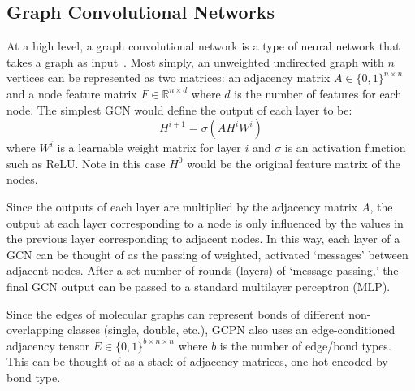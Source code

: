 \documentclass{article}
\begin{document}
\subsection{Graph Convolutional Networks}
At a high level, a graph convolutional network is a type of neural network that takes a graph as input~\cite{GCN}. Most simply, an unweighted undirected graph with $n$ vertices can be represented as two matrices: an adjacency matrix $A\in \{0,1\}^{n\times n}$ and a node feature matrix $F\in\mathbb{R}^{n\times d}$ where $d$ is the number of features for each node. The simplest GCN would define the output of each layer to be:
\[H^{i+1}=\sigma\left( AH^iW^i \right)\]
where $W^i$ is a learnable weight matrix for layer $i$ and $\sigma$ is an activation function such as ReLU. Note in this case $H^0$ would be the original feature matrix of the nodes.

Since the outputs of each layer are multiplied by the adjacency matrix $A$, the output at each layer corresponding to a node is only influenced by the values in the previous layer corresponding to adjacent nodes. In this way, each layer of a GCN can be thought of as the passing of weighted, activated `messages' between adjacent nodes. After a set number of rounds (layers) of `message passing,' the final GCN output can be passed to a standard multilayer perceptron (MLP).

Since the edges of molecular graphs can represent bonds of different non-overlapping classes (single, double, etc.), GCPN also uses an edge-conditioned adjacency tensor $E\in\{0,1\}^{b\times n\times n}$ where $b$ is the number of edge/bond types. This can be thought of as a stack of adjacency matrices, one-hot encoded by bond type.
\end{document}
